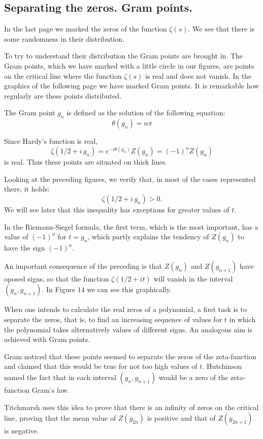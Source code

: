 \documentclass[a4paper]{amsart}
\numberwithin{equation}{section}
\begin{document}
\begin{large}
    
\section{Separating the zeros. Gram points.}
In the last page we marked the zeros of the function $\zeta(s)$. We see that
there is some randomness in their distribution.

To try to understand their distribution the Gram points are brought in. The Gram
points, which we have marked with a little circle in our figures, are points
on the critical line where the function $\zeta(s)$ is real and does not
vanish. In the graphics of the following page we have marked Gram points. It
is remarkable how regularly are these points distributed.
\medskip

The Gram point $g_{n}$ is defined as the solution of the following equation:
$$\theta(g_n)=n\pi$$

Since Hardy's function is real,
$$\zeta(1/2+i \,g_n)=e^{-i\theta(g_n)}Z(g_n)=(-1)^n Z(g_n)$$ 
is real. Thus these points are situated on thick lines.

Looking at the preceding figures, we verify that, in most of the cases
represented there, it holds:
$$\zeta(1/2+i \,g_n)>0.$$  
We will see later that this inequality has exceptions for greater values of $t$.

In the Riemann-Siegel formula, the first term, which is the most important, has
a value of $(-1)^n$ for $t=g_n$, which partly explains the tendency of $Z(g_n)$
to have the sign $(-1)^n$.
\medskip

An important consequence of the preceding is that $Z(g_n)$ and $Z(g_{n + 1})$
have oposed signs, so that the function $\zeta(1/2 + it)$ will vanish in the
interval $(g_n, g_{n + 1})$. In Figure $14$ we can see this
graphically.

When one intends to calculate the real zeros of a polynomial, a first task is
to separate the zeros, that is, to find an increasing sequence of values for
$t$ in which the polynomial takes alternatively values of different signs. An
analogous aim is achieved with Gram points.

Gram noticed that these points seemed to separate the zeros of the
zeta-function and claimed that this would be true for not too high values of
$t$. Hutchinson named the fact that in each interval $(g_n, g_{n + 1} )$ would
be a zero of the zeta-function Gram's law.

Titchmarsh uses this idea to prove that there is an infinity  of zeros
on the critical line, proving that the mean value of $Z(g_{2n})$ is positive
and that of $Z(g_{2n + 1})$ is negative.


\end{large}
\end{document}
